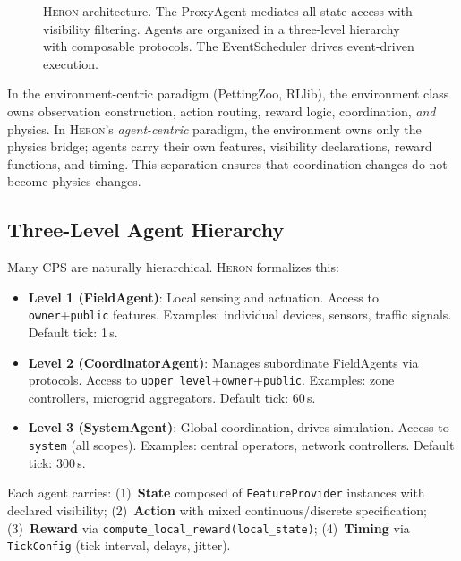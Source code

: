 \documentclass{article}
\newcommand{\heron}{\textsc{Heron}}
\begin{document}
\begin{figure}[t]
\caption{\heron{} architecture. The ProxyAgent mediates all state access with visibility filtering. Agents are organized in a three-level hierarchy with composable protocols. The EventScheduler drives event-driven execution.}
\label{fig:architecture}
\end{figure}

In the environment-centric paradigm (PettingZoo, RLlib), the environment class owns observation construction, action routing, reward logic, coordination, \emph{and} physics. In \heron{}'s \emph{agent-centric} paradigm, the environment owns only the physics bridge; agents carry their own features, visibility declarations, reward functions, and timing. This separation ensures that coordination changes do not become physics changes.

\subsection{Three-Level Agent Hierarchy}
\label{sec:hierarchy}

Many CPS are naturally hierarchical. \heron{} formalizes this:
\begin{itemize}[nosep]
    \item \textbf{Level 1 (FieldAgent)}: Local sensing and actuation. Access to \texttt{owner}+\texttt{public} features. Examples: individual devices, sensors, traffic signals. Default tick: 1\,s.
    \item \textbf{Level 2 (CoordinatorAgent)}: Manages subordinate FieldAgents via protocols. Access to \texttt{upper\_level}+\texttt{owner}+\texttt{public}. Examples: zone controllers, microgrid aggregators. Default tick: 60\,s.
    \item \textbf{Level 3 (SystemAgent)}: Global coordination, drives simulation. Access to \texttt{system} (all scopes). Examples: central operators, network controllers. Default tick: 300\,s.
\end{itemize}

Each agent carries: (1)~\textbf{State} composed of \texttt{FeatureProvider} instances with declared visibility; (2)~\textbf{Action} with mixed continuous/discrete specification; (3)~\textbf{Reward} via \texttt{compute\_local\_reward(local\_state)}; (4)~\textbf{Timing} via \texttt{TickConfig} (tick interval, delays, jitter).
\end{document}
